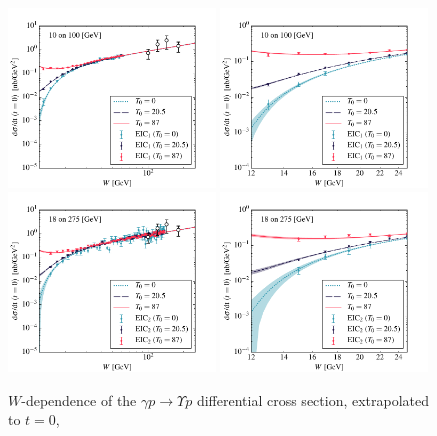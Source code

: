 \documentclass[prd,amsmath,%
twocolumn,floatfix,amssymb, preprintnumbers, linenumbers,nofootinbib, superscriptaddress]{revtex4}
\begin{document}
\begin{figure}
\includegraphics[width=0.49\textwidth]{dsdt_y_eic1.pdf}
\includegraphics[width=0.49\textwidth]{dsdt_y_close_eic1.pdf} \\
\includegraphics[width=0.49\textwidth]{dsdt_y_eic2.pdf}
\includegraphics[width=0.49\textwidth]{dsdt_y_close_eic2.pdf}
\caption{$W$-dependence of the $\gamma p \to \Upsilon p$ differential cross section, extrapolated to $t=0$, 
}
\end{figure}
\end{document}

